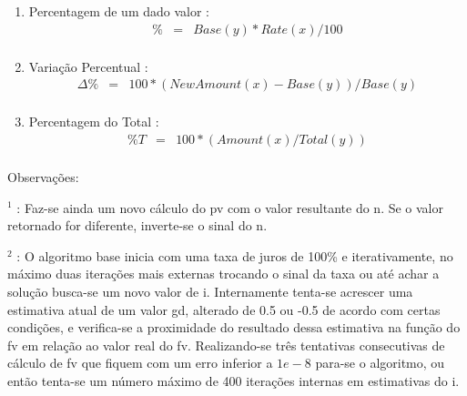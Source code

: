 \begin{enumerate}

\item Percentagem de um dado valor \cite{man1}:
\begin{eqnarray*}
 	\% &=& Base(y) * Rate(x) / 100 \\	
\end{eqnarray*}

\item Variação Percentual \cite{man1}:
\begin{eqnarray*}
 	\Delta\% &=& 100*(NewAmount(x)-Base(y))/Base(y) \\	
\end{eqnarray*}

\item Percentagem do Total \cite{man1}:
\begin{eqnarray*}
 	\%T &=& 100*(Amount(x)/Total(y)) \\	
\end{eqnarray*}

\end{enumerate}

Observações: 

$ ^{1} $ : Faz-se ainda um novo cálculo do pv com o valor resultante do n. Se o valor retornado for diferente, inverte-se o sinal do n.

$ ^{2} $ : O algoritmo base inicia com uma taxa de juros de 100\% e iterativamente, no máximo duas iterações mais externas trocando o sinal da taxa ou até achar a solução busca-se um novo valor de i. Internamente tenta-se acrescer uma estimativa atual de um valor gd, alterado de 0.5 ou -0.5 de acordo com certas condições, e verifica-se a proximidade do resultado dessa estimativa na função do fv em relação ao valor real do fv. Realizando-se três tentativas consecutivas de cálculo de fv que fiquem com um erro inferior a $ 1e-8 $ para-se o algoritmo, ou então tenta-se um número máximo de 400 iterações internas em estimativas do i.